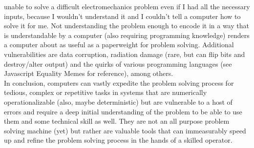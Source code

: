 \documentclass[10pt]{report}
\begin{document}
unable to solve a difficult electromechanics problem even if I had all the necessary inputs, because I wouldn't understand it and I couldn't tell a computer how to solve it for me. Not understanding the problem enough to encode it in a way that is understandable by a computer (also requiring programming knowledge) renders a computer about as useful as a paperweight for problem solving. Additional vulnerabilities are data corruption, radiation damage (rare, but can flip bits and destroy/alter output) and the quirks of various programming languages (see Javascript Equality Memes for reference), among others.\\ In conclusion, computers can vastly expedite the problem solving process for tedious, complex or repetitive tasks in systems that are numerically operationalizable (also, maybe deterministic) but are vulnerable to a host of errors and require a deep initial understanding of the problem to be able to use them and some technical skill as well. They are not an all purpose problem solving machine (yet) but rather are valuable tools that can immeasurably speed up and refine the problem solving process in the hands of a skilled operator.
    \pagebreak
\end{document}
